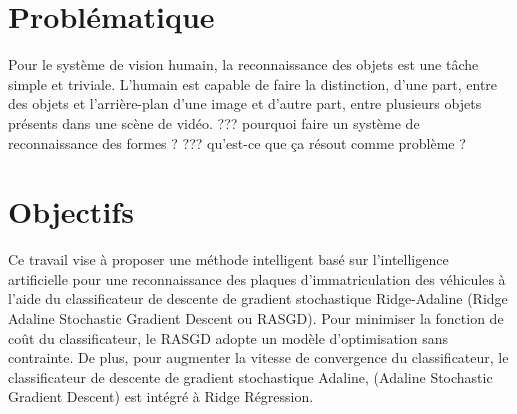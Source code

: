 	\section{Problématique}
		Pour le système de vision humain, la reconnaissance des objets est une tâche simple et triviale. L'humain est capable de faire la distinction, d'une part, entre des objets et l'arrière-plan d'une image et d'autre part, entre plusieurs objets présents dans une scène de vidéo.
		??? pourquoi faire un système de reconnaissance des formes ?
		??? qu'est-ce que ça résout comme problème ?
	
	\section{Objectifs}
		Ce travail vise à proposer une méthode  intelligent basé sur l'intelligence artificielle pour une reconnaissance des plaques d’immatriculation des véhicules à l'aide du classificateur de descente de gradient stochastique Ridge-Adaline (Ridge Adaline Stochastic Gradient Descent ou RASGD).
		Pour minimiser la fonction de coût du classificateur, le RASGD adopte un modèle d'optimisation sans contrainte. De plus, pour augmenter la vitesse de convergence du classificateur, le classificateur de descente de gradient stochastique Adaline, (Adaline Stochastic Gradient Descent) est intégré à Ridge Régression.\cite{deepa2021ai}